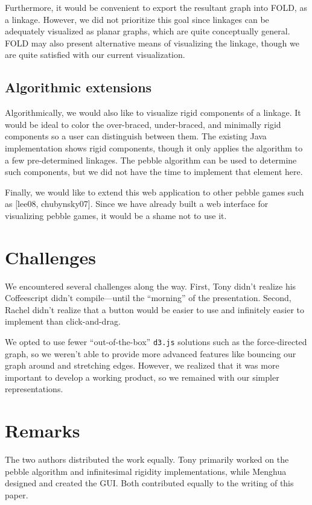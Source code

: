 \documentclass[aps,prd,final,twocolumn,letterpaper,nofootinbib]{revtex4-1}
\begin{document}
Furthermore, it would be convenient to export the resultant graph into FOLD,
as a linkage. However, we did not prioritize this goal since
linkages can be adequately visualized as planar graphs,
which are quite conceptually general.
FOLD may also present alternative means of visualizing the linkage,
though we are quite satisfied with our current visualization.

\subsection{Algorithmic extensions}

Algorithmically, we would also like to visualize rigid components of a linkage.
It would be ideal to color the over-braced,
under-braced, and minimally rigid components so a user
can distinguish between them.
The existing Java implementation shows rigid components,
though it only applies the algorithm to a few pre-determined linkages.
The pebble algorithm can be used to determine such components,
but we did not have the time to implement that element here.

Finally, we would like to extend this web application to other pebble games
such as [lee08, chubynsky07].
Since we have already built a web interface for visualizing pebble games,
it would be a shame not to use it.

\section*{Challenges}

We encountered several challenges along the way.
First, Tony didn't realize his Coffeescript didn't compile---until the ``morning''
of the presentation.
Second, Rachel didn't realize that a button would be easier to use
and infinitely easier to implement than click-and-drag.

We opted to use fewer ``out-of-the-box'' \texttt{d3.js} solutions such as
the force-directed graph, so we weren't able to provide more advanced features
like bouncing our graph around and stretching edges.
However, we realized that it was more important to develop a working product,
so we remained with our simpler representations.

\section*{Remarks}

The two authors distributed the work equally.
Tony primarily worked on the pebble algorithm and infinitesimal rigidity implementations,
while Menghua designed and created the GUI.
Both contributed equally to the writing of this paper.
\end{document}
